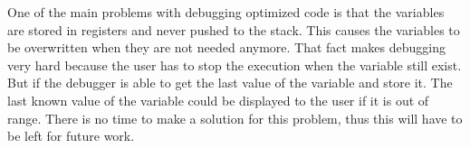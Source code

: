 One of the main problems with debugging optimized code is that the variables are stored in registers and never pushed to the stack.
This causes the variables to be overwritten when they are not needed anymore.
That fact makes debugging very hard because the user has to stop the execution when the variable still exist.
But if the debugger is able to get the last value of the variable and store it.
The last known value of the variable could be displayed to the user if it is out of range.
There is no time to make a solution for this problem, thus this will have to be left for future work.




